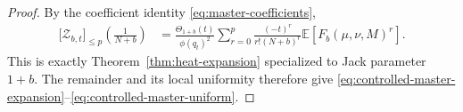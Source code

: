 \documentclass[11pt,a4paper,reqno]{article}
\theoremstyle{definition}
\theoremstyle{remark}
\newcommand\E{{\mathbb E}}
\begin{document}
\begin{proof}
By the coefficient identity \eqref{eq:master-coefficients},
\begin{align*}
\bigl[\mathcal Z_{b,t}\bigr]_{\leq p}\left(\frac{1}{N+b}\right)&=\frac{\Theta_{1+b}(t)}{\phi(q_t)^2}\sum_{r=0}^p\frac{(-t)^r}{r!(N+b)^r}\E\left[F_b(\mu,\nu,M)^r\right].
\end{align*}
This is exactly Theorem~\ref{thm:heat-expansion} specialized to Jack parameter $1+b$.  The remainder and its local uniformity therefore give \eqref{eq:controlled-master-expansion}--\eqref{eq:controlled-master-uniform}.
\end{proof}




\end{document}
